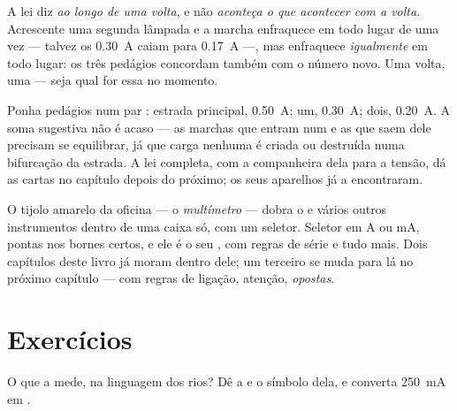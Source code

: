 \begin{example}\label{ex:g8:intensity-ammeter:fineprint}
A lei diz \emph{ao longo de uma volta}, e não \emph{aconteça o que
acontecer com a volta}. Acrescente uma segunda lâmpada  e a
marcha enfraquece em todo lugar de uma vez --- talvez os
\qty{0.30}{A} caiam para \qty{0.17}{A} ---, mas enfraquece
\emph{igualmente} em todo lugar: os três pedágios concordam também
com o número novo. Uma volta, uma  --- seja qual for essa
 no momento.
\end{example}

\begin{example}\label{ex:g8:intensity-ammeter:junction}
Ponha pedágios num par : estrada principal, \qty{0.50}{A};
 um, \qty{0.30}{A};  dois, \qty{0.20}{A}. A soma sugestiva
não é acaso --- as marchas que entram num  e as que saem dele
precisam se equilibrar, já que carga nenhuma é criada ou destruída
numa bifurcação da estrada. A lei completa, com a companheira dela
para a tensão, dá as cartas no capítulo depois do próximo; os seus
aparelhos já a encontraram.
\end{example}

\begin{remark}[O multímetro]\label{rem:g8:intensity-ammeter:multimeter}
O tijolo amarelo da oficina --- o \emph{multímetro} --- dobra o
 e vários outros instrumentos dentro de uma caixa só, com
um seletor. Seletor em \unit{A} ou \unit{mA}, pontas nos bornes
certos, e ele é o seu , com regras de série e tudo mais.
Dois capítulos deste livro já moram dentro dele; um terceiro se muda
para lá no próximo capítulo --- com regras de ligação, atenção,
\emph{opostas}.
\end{remark}

\section{Exercícios}

\begin{exercise}[$\star$]\label{exo:g8:intensity-ammeter:1}
O que a  mede, na linguagem dos rios? Dê a  e o
símbolo dela, e converta \qty{250}{mA} em .
\end{exercise}

